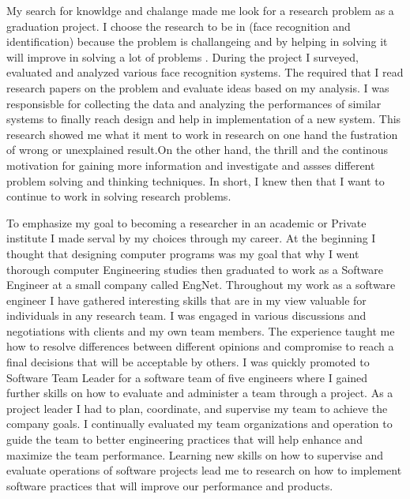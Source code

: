 \documentclass[a4paper,12pt]{article}%
\begin{document}
  My search for knowldge and chalange made me look for a research problem as a graduation project. I choose the research to be in (face recognition and identification) because the problem is challangeing and by helping in solving it will improve in solving a lot of problems . During the project I  surveyed, evaluated and analyzed various face recognition systems. The required that I read research papers on the problem and evaluate ideas based on my analysis. I was responsisble for collecting the data and analyzing the performances of similar systems to finally reach design and help in implementation of a new system. This research showed me what it ment to work in research on one hand the fustration of wrong or unexplained result.On the other hand, the thrill and the continous motivation for gaining more information and investigate and assses different problem solving and thinking techniques. In short, I knew then that I want to continue to work in solving research problems. %
 
To emphasize my goal to becoming a researcher in an academic or Private institute I made serval by my choices through my career. At the beginning I thought that designing computer programs was my goal that why I went thorough computer Engineering studies then graduated to work as a Software Engineer at a small company called EngNet. Throughout my work as a software engineer I have gathered interesting skills that are in my view valuable for individuals in any research team.  I was engaged in various discussions and negotiations with clients and my own team members. The experience taught me how to resolve differences between different opinions and compromise to reach a final decisions that will be acceptable by others. I was quickly promoted to Software Team Leader for a software team of five engineers  where I gained further skills on how to  evaluate and administer a team through a project. As a project leader I had to plan, coordinate, and  supervise my team to achieve the company goals. I continually evaluated my team organizations and operation to guide the team to better engineering practices that will help enhance and maximize the team performance.  Learning new skills on how to supervise and evaluate operations of software projects lead me to research on how to implement software practices that will improve our performance and products.  
 
\end{document}
